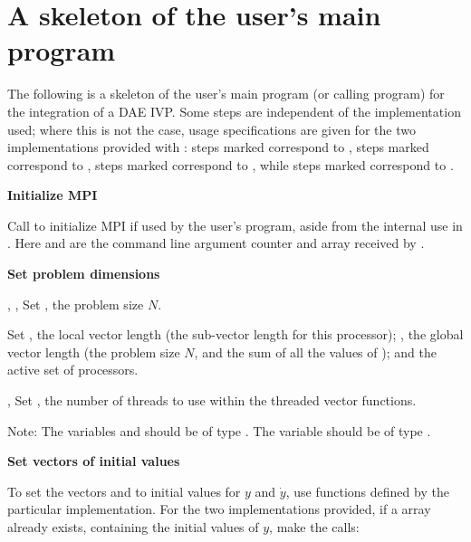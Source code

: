 \section{A skeleton of the user's main program}\label{ss:skeleton_sim}
The following is a skeleton of the user's main program (or calling
program) for the integration of a DAE IVP. Some steps are independent of the
{\nvector} implementation used; where this is not the case, usage specifications
are given for the two implementations provided with {\ida}: steps marked {\p}
correspond to {\nvecp}, steps marked {\omp} correspond to
{\nvecopenmp}, steps marked {\pt} correspond to {\nvecpthreads},
while steps marked {\s} correspond to {\nvecs}. 
\begin{Steps}
  
\item 
  {\bf {\p} Initialize MPI}

  Call  to initialize MPI if used by
  the user's program, aside from the internal use in {\nvecp}.  
  Here  and  are the command line argument 
  counter and array received by .
  
\item
  {\bf Set problem dimensions}

  {\s, \omp, \pt} Set , the problem size $N$.

  {\p} Set , the local vector length (the sub-vector
  length for this processor); , the global vector length (the
  problem size $N$, and the sum of all the values of );
  and the active set of processors.

  {\omp, \pt} Set , the number of threads to use
  within the threaded vector functions.

  Note: The variables  and  should be of type
  .  The variable  should be of type .

\item
  {\bf Set vectors of initial values}
 
  To set the vectors  and  to initial values for $y$ and $\dot{y}$, 
  use functions defined by the particular {\nvector} implementation. 
  For the two {\nvector} implementations provided, if a  array  
  already exists, containing the initial values of $y$, make the calls:


\end{Steps}
